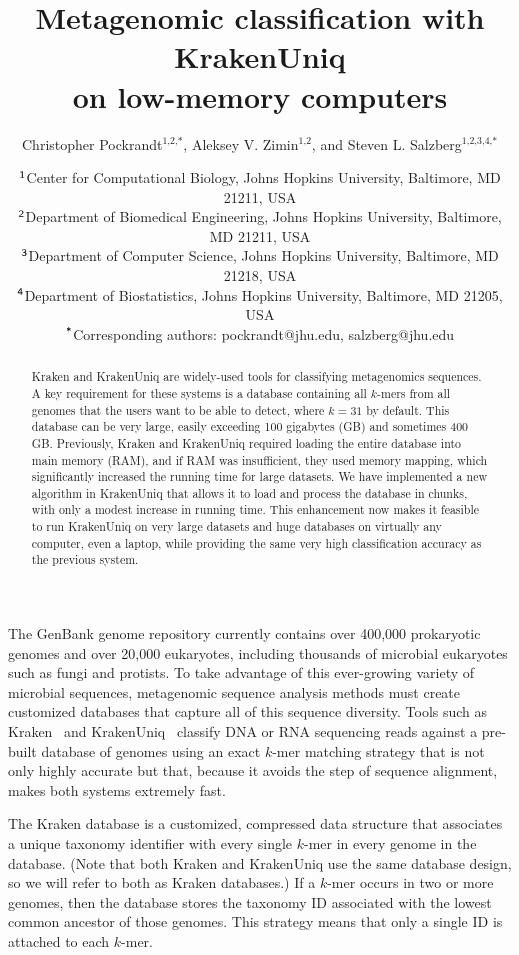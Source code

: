 \documentclass{article}
\title{Metagenomic classification with KrakenUniq\\ on low-memory computers}
\author{Christopher Pockrandt$^{\text{1,2,*}}$, Aleksey V. Zimin$^{\text{1,2}}$, and Steven L. Salzberg$^{\text{1,2,3,4,*}}$}
\date{\small $^{\text{\sf 1}}$Center for Computational Biology, Johns Hopkins University, Baltimore, MD 21211, USA \\
$^{\text{\sf 2}}$Department of Biomedical Engineering, Johns Hopkins University, Baltimore, MD 21211, USA \\
$^{\text{\sf 3}}$Department of Computer Science, Johns Hopkins University, Baltimore, MD 21218, USA \\
$^{\text{\sf 4}}$Department of Biostatistics, Johns Hopkins University, Baltimore, MD 21205, USA \\
$^{\text{\sf *}}$Corresponding authors: pockrandt@jhu.edu, salzberg@jhu.edu }
\begin{document}
\maketitle

\begin{abstract}
Kraken and KrakenUniq are widely-used tools for classifying metagenomics sequences. A key requirement for these systems is a database containing all $k$-mers from all genomes that the users want to be able to detect, where $k=31$ by default. This database can be very large, easily exceeding 100 gigabytes (GB) and sometimes 400 GB. Previously, Kraken and KrakenUniq required loading the entire database into main memory (RAM), and if RAM was insufficient, they used memory mapping, which significantly increased the running time for large datasets. We have implemented a new algorithm in KrakenUniq that allows it to load and process the database in chunks, with only a modest increase in running time. This enhancement now makes it feasible to run KrakenUniq on very large datasets and huge databases on virtually any computer, even a laptop, while providing the same very high classification accuracy as the previous system.
\end{abstract}


The GenBank genome repository currently contains over 400,000 prokaryotic genomes and over 20,000 eukaryotes, including thousands of microbial eukaryotes such as fungi and protists. To take advantage of this ever-growing variety of microbial sequences, metagenomic sequence analysis methods must create customized databases that capture all of this sequence diversity. Tools such as Kraken~\cite{wood2014kraken} and KrakenUniq~\cite{breitwieser2018krakenuniq} classify DNA or RNA sequencing reads against a pre-built database of genomes using an exact $k$-mer matching strategy that is not only highly accurate but that, because it avoids the step of sequence alignment, makes both systems extremely fast. 

The Kraken database is a customized, compressed data structure that associates a unique taxonomy identifier with every single $k$-mer in every genome in the database. (Note that both Kraken and KrakenUniq use the same database design, so we will refer to both as Kraken databases.) If a $k$-mer occurs in two or more genomes, then the database stores the taxonomy ID associated with the lowest common ancestor of those genomes. This strategy means that only a single ID is attached to each $k$-mer. 
\end{document}

